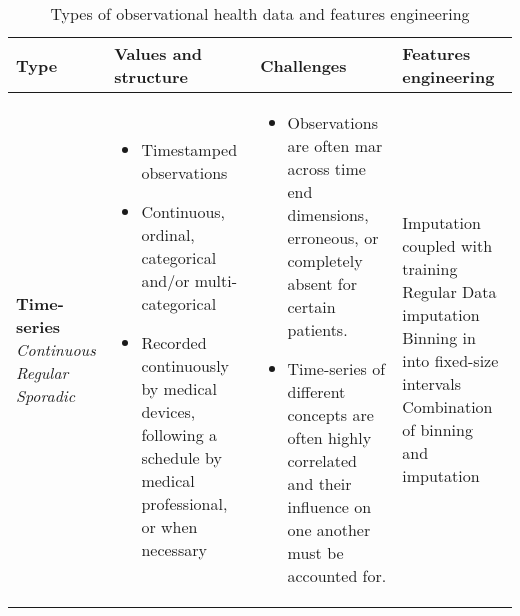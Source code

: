 \begin{table}[H]
        \footnotesize
        \caption{Types of observational health data and features engineering}\label{tab:features}
    
        \begin{tabularx}{\textwidth}{@{}p{}p{}p{}X@{}} \toprule
            Type & Values and structure & Challenges & Features engineering\\ \midrule
            
            \textbf{Time-series}\newline
            \textit{Continuous}\newline 
            \textit{Regular}\newline
            \textit{Sporadic}
            &\begin{minipage}[t]{0.3\textwidth}{
            \begin{itemize}[leftmargin=*]  
                \item Timestamped observations 
                \item Continuous, ordinal, categorical and/or multi-categorical
                \item Recorded continuously by medical devices, following a schedule by medical professional, or when necessary
            \end{itemize}}
            \end{minipage}
            &\begin{minipage}[t]{0.3\textwidth}{
            \begin{itemize}[leftmargin=*]  
                \item Observations are often \gls{mar} across time end dimensions, erroneous, or completely absent for certain patients.
                \item Time-series of different concepts are often highly correlated and their influence on one another must be accounted for.
             \end{itemize}}
             \end{minipage}
            & Imputation coupled with training \newline Regular \newline Data imputation \newline Binning in into fixed-size intervals \newline Combination of binning and imputation \\
            

\end{tabularx}
\end{table}
